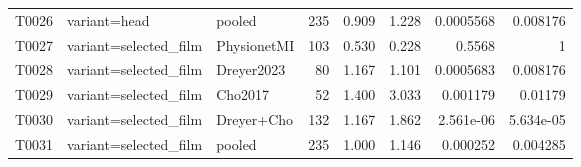\begin{longtable}{p{.45in}p{2.6in}p{.75in}rrrrr}
T0026 & variant=head & pooled & 235 & 0.909 & 1.228 & 0.0005568 & 0.008176 \\
T0027 & variant=selected\_\allowbreak{}film & PhysionetMI & 103 & 0.530 & 0.228 & 0.5568 & 1 \\
T0028 & variant=selected\_\allowbreak{}film & Dreyer2023 & 80 & 1.167 & 1.101 & 0.0005683 & 0.008176 \\
T0029 & variant=selected\_\allowbreak{}film & Cho2017 & 52 & 1.400 & 3.033 & 0.001179 & 0.01179 \\
T0030 & variant=selected\_\allowbreak{}film & Dreyer+Cho & 132 & 1.167 & 1.862 & 2.561e-06 & 5.634e-05 \\
T0031 & variant=selected\_\allowbreak{}film & pooled & 235 & 1.000 & 1.146 & 0.000252 & 0.004285 \\
\bottomrule
\end{longtable}
